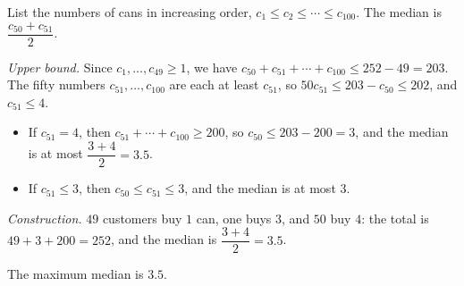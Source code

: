 List the numbers of cans in increasing order, $c_1\le c_2\le\cdots\le c_{100}$. The median is $\dfrac{c_{50}+c_{51}}2$.

\emph{Upper bound.} Since $c_1,\dots,c_{49}\ge1$, we have $c_{50}+c_{51}+\cdots+c_{100}\le252-49=203$. The fifty numbers $c_{51},\dots,c_{100}$ are each at least $c_{51}$, so $50c_{51}\le203-c_{50}\le202$, and $c_{51}\le4$.
\begin{itemize}
\item If $c_{51}=4$, then $c_{51}+\cdots+c_{100}\ge200$, so $c_{50}\le203-200=3$, and the median is at most $\dfrac{3+4}2=3.5$.
\item If $c_{51}\le3$, then $c_{50}\le c_{51}\le3$, and the median is at most $3$.
\end{itemize}

\emph{Construction.} $49$ customers buy $1$ can, one buys $3$, and $50$ buy $4$: the total is $49+3+200=252$, and the median is $\dfrac{3+4}2=3.5$.

The maximum median is $\boxed{3.5}$.
